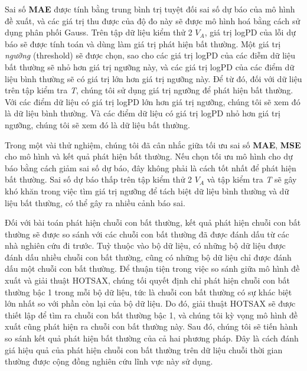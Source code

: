 Sai số \textbf{MAE} được tính bằng trung bình trị tuyệt đối sai số dự báo của mô hình đề xuất, và các giá trị thu được của độ đo này sẽ được mô hình hoá bằng cách sử dụng phân phối Gauss. Trên tập dữ liệu kiểm thử 2 $V_{A}$, giá trị logPD của lỗi dự báo sẽ được tính toán và dùng làm giá trị phát hiện bất thường. Một giá trị \textit{ngưỡng} (threshold) sẽ được chọn,  sao cho các giá trị logPD của các điễm dữ liệu bất thường sẽ nhỏ hơn giá trị ngưỡng này, và các giá trị logPD của các điểm dữ liệu bình thường sẽ có giá trị lớn hơn giá trị ngưỡng này. Để từ đó, đối với dữ liệu trên tập kiểm tra \textit{T}, chúng tôi sử dụng giá trị ngưỡng để phát hiện bất thường. Với các điểm dữ liệu có giá trị logPD lớn hơn giá trị ngưỡng, chúng tôi sẽ xem đó là dữ liệu bình thường. Và các điểm dữ liệu có giá trị logPD nhỏ hơn giá trị ngưỡng, chúng tôi sẽ xem đó là dữ liệu bất thường.

Trong một vài thử nghiệm, chúng tôi đã cân nhắc giữa tối ưu sai số \textbf{MAE}, \textbf{MSE} cho mô hình và kết quả phát hiện bất thường. Nếu chọn tối ưu mô hình cho dự báo bằng cách giảm sai số dự báo, đây không phải là cách tốt nhất để phát hiện bất thường. Sai số dự báo thấp trên tập kiểm thử 2 $V_{A}$ và tập kiểm tra \textit{T} sẽ gây khó khăn trong việc tìm giá trị ngưỡng để tách biệt dữ liệu bình thường và dữ liệu bất thường, có thể gây ra nhiều cảnh báo sai.

Đối với bài toán phát hiện chuỗi con bất thường, kết quả phát hiện chuỗi con bất thường sẽ được so sánh với các chuỗi con bất thường đã được đánh dấu từ các nhà nghiên cứu đi trước. Tuỳ thuộc vào bộ dữ liệu, có những bộ dữ liệu được đánh dấu nhiều chuỗi con bất thường, cũng có những bộ dữ liệu chỉ được đánh dấu một chuỗi con bất thường. Để thuận tiện trong việc so sánh giữa mô hình đề xuất và giải thuật HOTSAX, chúng tối quyết định chỉ phát hiện chuỗi con bất thường bậc 1 trong mỗi bộ dữ liệu, tức là chuỗi con bất thường có sự khác biệt lớn nhất so với phần còn lại của bộ dữ liệu. Do đó, giải thuật HOTSAX sẽ được thiết lập để tìm ra chuỗi con bất thường bậc 1, và chúng tôi kỳ vọng mô hình đề xuất cũng phát hiện ra chuỗi con bất thường này. Sau đó, chúng tôi sẽ tiến hành so sánh kết quả phát hiện bất thường của cả hai phương pháp. Đây là cách đánh giá hiệu quả của phát hiện chuỗi con bất thường trên dữ liệu chuỗi thời gian thường được cộng đồng nghiên cứu lĩnh vực này sử dụng.

